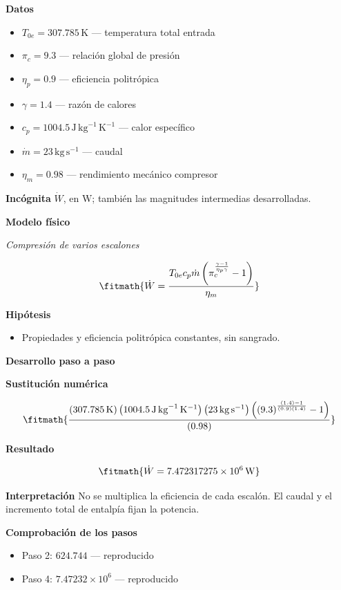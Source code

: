 \documentclass[10pt,openany]{book}
\begin{document}
\noindent\textbf{Datos}
\begin{itemize}
\item $T_{0e} = 307.785\,\mathrm{K}$ — temperatura total entrada
\item $\pi_c = 9.3$ — relación global de presión
\item $\eta_p = 0.9$ — eficiencia politrópica
\item $\gamma = 1.4$ — razón de calores
\item $c_p = 1004.5\,\mathrm{J}\,\mathrm{kg}^{-1}\,\mathrm{K}^{-1}$ — calor específico
\item $\dot m = 23\,\mathrm{kg}\,\mathrm{s}^{-1}$ — caudal
\item $\eta_m = 0.98$ — rendimiento mecánico compresor
\end{itemize}

\noindent\textbf{Incógnita}
$\dot{W}$, en $\mathrm{W}$; también las magnitudes intermedias desarrolladas.

\noindent\textbf{Modelo físico}

\noindent\textit{Compresión de varios escalones}

\[
\fitmath{\dot{W}=\frac{T_{0e} c_p \dot m \left(\pi_c^{\frac{\gamma - 1}{\eta_p \gamma}} - 1\right)}{\eta_m}}
\]

\noindent\textbf{Hipótesis}
\begin{itemize}
\item Propiedades y eficiencia politrópica constantes, sin sangrado.
\end{itemize}

\noindent\textbf{Desarrollo paso a paso}



\noindent\textbf{Sustitución numérica}

\[
\fitmath{\frac{\left(307.785\,\mathrm{K}\right) \left(1004.5\,\mathrm{J}\,\mathrm{kg}^{-1}\,\mathrm{K}^{-1}\right) \left(23\,\mathrm{kg}\,\mathrm{s}^{-1}\right) \left(\left(9.3\right)^{\frac{\left(1.4\right) - 1}{\left(0.9\right) \left(1.4\right)}} - 1\right)}{\left(0.98\right)}}
\]

\noindent\textbf{Resultado}

\[
\fitmath{\dot{W}=7.472317275\times10^{6}\,\mathrm{W}}
\]

\noindent\textbf{Interpretación}
No se multiplica la eficiencia de cada escalón. El caudal y el incremento total de entalpía fijan la potencia.

\noindent\textbf{Comprobación de los pasos}
\begin{itemize}
\item Paso 2: $624.744$ — reproducido
\item Paso 4: $7.47232\times 10^{6}$ — reproducido
\end{itemize}
\end{document}
